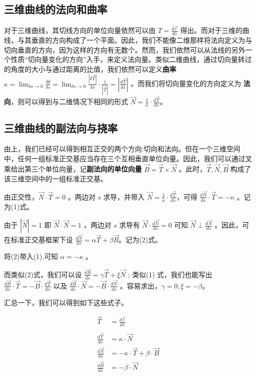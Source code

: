 \documentclass[fontset=windows]{article}
\begin{document}
\subsection{三维曲线的法向和曲率}

对于三维曲线，其切线方向的单位向量依然可以由 $T = \frac{d\vec{r}}{ds}$ 得出。而对于三维的曲线，与其垂直的方向构成了一个平面。因此，我们不能像二维那样将法向定义为与切向垂直的方向，因为这样的方向有无数个。然而，我们依然可以从法线的另外一个性质“切向量变化的方向”入手，来定义法向量。类似二维曲线，通过切向量转过的角度的大小与通过距离的比值，我们依然可以定义\textbf{曲率} $\kappa = \lim_{\delta s \rightarrow 0}{\frac{δθ}{δs}} = \lim_{\delta s \rightarrow 0}{\frac{|\delta {\vec{T}}|}{\delta s}}\cdot{\frac1{|\vec{T}|}} = |\frac{d\vec T}{ds}|$ 。而我们将切向量变化的方向定义为 \textbf{法向}，则可以得到与二维情况下相同的形式 $\vec{N} = \frac1{\kappa}\cdot\frac{d\vec{T}}{ds}$。

\subsection{三维曲线的副法向与挠率}
由上，我们已经可以得到相互正交的两个方向:切向和法向。但在一个三维空间中，任何一组标准正交基应当存在三个互相垂直单位向量。因此，我们可以通过叉乘给出第三个单位向量，记\textbf{副法向的单位向量} $\vec{B} = \vec{T} \times \vec{N}$ 。此时，$\vec{T},\vec{N},\vec{B}$ 构成了该三维空间中的一组标准正交基。

由正交性，$\vec N \cdot \vec T = 0$ 。两边对 $s$ 求导，并带入 $\vec N = \frac1{\kappa} \cdot \frac{d\vec T}{ds} $，可得 $\frac{d\vec N}{ds} \cdot \vec T = -\kappa$ 。记为(1)式。

由于 $|\vec{N}| = 1$ 即 $\vec N \cdot \vec N = 1$ ，两边对 $s$ 求导有 $\vec N\cdot \frac{d\vec N}{ds} = 0$ 可知 $\vec N \perp \frac{d\vec N}{ds}$ 。因此，可在标准正交基框架下设 $\frac{d\vec N}{ds} = \alpha \vec T + \beta \vec B $。记为(2)式。

将(2)带入(1),可知 $\alpha = -\kappa$ 。

而类似(2)式，我们可以设 $\frac{d\vec B}{ds} = \gamma \vec T + \xi \vec N $ ; 类似(1) 式，我们也能写出 $\frac{d\vec B}{ds} \cdot \vec T = -\vec{B} \cdot \frac{d\vec T}{ds} $ 以及 $ \frac{d\vec B}{ds} \cdot \vec N = -\vec{B} \cdot \frac{d\vec N}{ds} $ 。容易求出，$\gamma = 0,\xi = -\beta$。

汇总一下，我们可以得到如下这些式子。

$$
\begin{aligned}
\vec{T} &= \frac{d\vec{r}}{ds}\\
\\
\frac{d\vec T}{ds} &= \kappa \cdot \vec N \\
\frac{d\vec N}{ds} &= -\kappa \cdot \vec T + \beta \cdot \vec B\\
\frac{d\vec B}{ds} &= -\beta \cdot \vec N \\
\end{aligned}
$$
\end{document}
